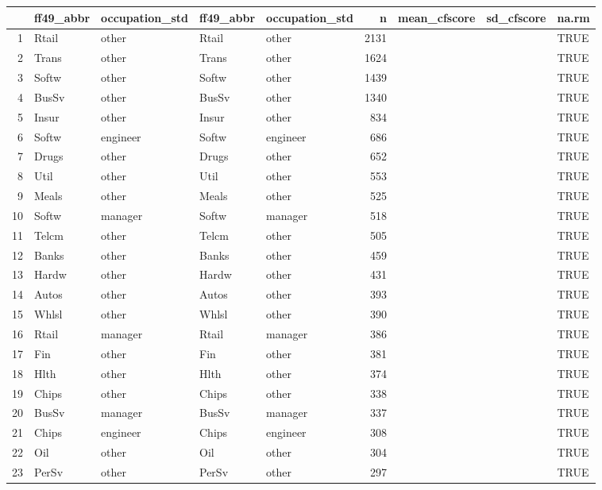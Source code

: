 \begin{table}[ht]
\centering
\begin{tabular}{rllllrrrl}
  \hline
 & ff49\_abbr & occupation\_std & ff49\_abbr & occupation\_std & n & mean\_cfscore & sd\_cfscore & na.rm \\ 
  \hline
1 & Rtail & other & Rtail & other & 2131 &  &  & TRUE \\ 
  2 & Trans & other & Trans & other & 1624 &  &  & TRUE \\ 
  3 & Softw & other & Softw & other & 1439 &  &  & TRUE \\ 
  4 & BusSv & other & BusSv & other & 1340 &  &  & TRUE \\ 
  5 & Insur & other & Insur & other & 834 &  &  & TRUE \\ 
  6 & Softw & engineer & Softw & engineer & 686 &  &  & TRUE \\ 
  7 & Drugs & other & Drugs & other & 652 &  &  & TRUE \\ 
  8 & Util & other & Util & other & 553 &  &  & TRUE \\ 
  9 & Meals & other & Meals & other & 525 &  &  & TRUE \\ 
  10 & Softw & manager & Softw & manager & 518 &  &  & TRUE \\ 
  11 & Telcm & other & Telcm & other & 505 &  &  & TRUE \\ 
  12 & Banks & other & Banks & other & 459 &  &  & TRUE \\ 
  13 & Hardw & other & Hardw & other & 431 &  &  & TRUE \\ 
  14 & Autos & other & Autos & other & 393 &  &  & TRUE \\ 
  15 & Whlsl & other & Whlsl & other & 390 &  &  & TRUE \\ 
  16 & Rtail & manager & Rtail & manager & 386 &  &  & TRUE \\ 
  17 & Fin & other & Fin & other & 381 &  &  & TRUE \\ 
  18 & Hlth & other & Hlth & other & 374 &  &  & TRUE \\ 
  19 & Chips & other & Chips & other & 338 &  &  & TRUE \\ 
  20 & BusSv & manager & BusSv & manager & 337 &  &  & TRUE \\ 
  21 & Chips & engineer & Chips & engineer & 308 &  &  & TRUE \\ 
  22 & Oil & other & Oil & other & 304 &  &  & TRUE \\ 
  23 & PerSv & other & PerSv & other & 297 &  &  & TRUE \\ 

\end{tabular}
\end{table}
